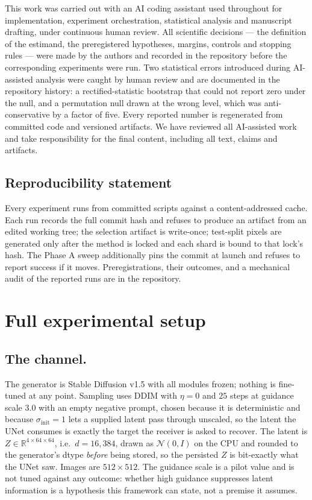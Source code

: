 \documentclass{article}
\theoremstyle{definition}
\begin{document}
This work was carried out with an AI coding assistant used throughout for implementation,
experiment orchestration, statistical analysis and manuscript drafting, under continuous
human review. All scientific decisions --- the definition of the estimand, the
preregistered hypotheses, margins, controls and stopping rules --- were made by the
authors and recorded in the repository before the corresponding experiments were run. Two
statistical errors introduced during AI-assisted analysis were caught by human review and
are documented in the repository history: a rectified-statistic bootstrap that could not
report zero under the null, and a permutation null drawn at the wrong level, which was
anti-conservative by a factor of five. Every reported number is regenerated from committed
code and versioned artifacts. We have reviewed all AI-assisted work and take
responsibility for the final content, including all text, claims and artifacts.

\subsection*{Reproducibility statement}

Every experiment runs from committed scripts against a content-addressed cache. Each run
records the full commit hash and refuses to produce an artifact from an edited working
tree; the selection artifact is write-once; test-split pixels are generated only after the
method is locked and each shard is bound to that lock's hash. The Phase A sweep additionally
pins the commit at launch and refuses to report success if it moves. Preregistrations,
their outcomes, and a mechanical audit of the reported runs are in the repository.

\appendix
\section{Full experimental setup}
\label{app:setup}


\subsection*{The channel.}
The generator is Stable Diffusion v1.5 with all modules frozen; nothing is fine-tuned at
any point. Sampling uses DDIM with $\eta=0$ and $25$ steps at guidance scale $3.0$ with an
empty negative prompt, chosen because it is deterministic and because
$\sigma_{\mathrm{init}}=1$ lets a supplied latent pass through unscaled, so the latent the
UNet consumes is exactly the target the receiver is asked to recover. The latent is
$Z\in\mathbb R^{4\times64\times64}$, i.e.\ $d=16{,}384$, drawn as $\mathcal N(0,I)$ on the
CPU and rounded to the generator's dtype \emph{before} being stored, so the persisted $Z$
is bit-exactly what the UNet saw. Images are $512\times512$. The guidance scale is a pilot
value and is not tuned against any outcome: whether high guidance suppresses latent
information is a hypothesis this framework can state, not a premise it assumes.
\end{document}
